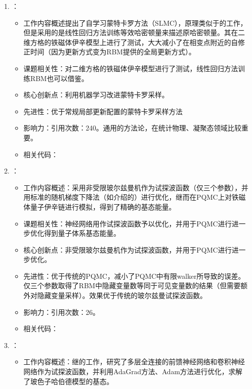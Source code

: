\begin{enumerate}
\begin{itemize}
        \end{itemize}
        \item \citet{liu2017self}：
        \begin{itemize}
            \item 工作内容概述提出了自学习蒙特卡罗方法（SLMC），原理类似于\citet{huang2017accelerated}的工作，但是采用的是线性回归方法训练等效哈密顿量来描述原哈密顿量。其在二维方格的铁磁体伊辛模型上进行了测试，大大减小了在相变点附近的自修正时间（因为更新方式变为RBM提供的全局更新方式）。
            \item 课题相关性：对二维方格的铁磁体伊辛模型进行了测试，线性回归方法训练RBM也可以借鉴。
            \item 核心创新点：利用机器学习改进蒙特卡罗采样。
            \item 先进性：优于常规局部更新配置的蒙特卡罗采样方法
            \item 影响力：引用次数：240。通用的方法论，在统计物理、凝聚态领域比较重要。
            \item 相关代码：
        \end{itemize}
        \item \citet{inack2018projective}：
            \begin{itemize}
                \item 工作内容概述：采用非受限玻尔兹曼机作为试探波函数（仅三个参数），并用标准的随机梯度下降法（如\citet{becca2017quantum}介绍的）进行优化，继而在PQMC上对铁磁体量子伊辛链进行模拟，得到了精确的基态能量。
                \item 课题相关性：神经网络用作试探波函数予以优化，并用于PQMC进行进一步优化得到量子体系基态能量。
                \item 核心创新点：非受限玻尔兹曼机作为试探波函数，并用于PQMC进行进一步优化。
                \item 先进性：优于传统的PQMC，减小了PQMC中有限walker所导致的误差。仅三个参数取得了RBM中隐藏变量数等同于可见变量数的结果（但需要额外对隐藏变量采样）。效果优于传统的玻尔兹曼试探波函数。
                \item 影响力：引用次数：26。
                \item 相关代码：
            \end{itemize}
        \item \citet{saito2018machine}：
            \begin{itemize}
                \item 工作内容概述：继\citet{saito2017solving}的工作，研究了多层全连接的前馈神经网络和卷积神经网络作为试探波函数，并利用AdaGrad方法\citep{duchi2011adaptive}、Adam方法\citep{kingma2014adam}进行优化，求解了玻色子哈伯德模型的基态。

\end{itemize}
\end{enumerate}
